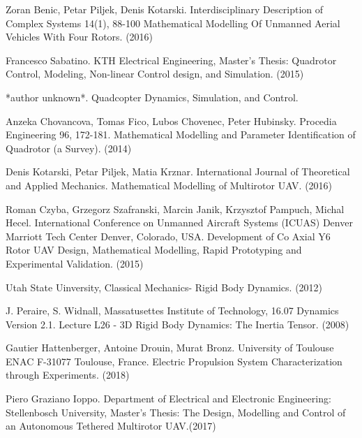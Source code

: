 \documentclass[12pt,a4paper,twoside]{report}
\begin{document}
	\begin{thebibliography}{20}

		
		Zoran Benic, Petar Piljek, Denis Kotarski. Interdisciplinary Description of Complex Systems 14(1), 88-100 Mathematical Modelling Of Unmanned Aerial Vehicles With Four Rotors. (2016)
		
		Francesco Sabatino. KTH Electrical Engineering, Master's Thesis: Quadrotor Control, Modeling, Non-linear Control design, and Simulation. (2015)
		
		*author unknown*. Quadcopter Dynamics, Simulation, and Control.
		
		Anzeka Chovancova, Tomas Fico, Lubos Chovenec, Peter Hubinsky. Procedia Engineering 96, 172-181. Mathematical Modelling and Parameter Identification of Quadrotor (a Survey). (2014)
	
		Denis Kotarski, Petar Piljek, Matia Krznar. International Journal of Theoretical and Applied Mechanics. Mathematical Modelling of Multirotor UAV. (2016)
		
		Roman Czyba, Grzegorz Szafranski, Marcin Janik, Krzysztof Pampuch, Michal Hecel. International Conference on Unmanned Aircraft Systems (ICUAS) Denver Marriott Tech Center Denver, Colorado, USA. Development of Co Axial Y6 Rotor UAV  Design, Mathematical Modelling, Rapid Prototyping and Experimental Validation. (2015)
		
		Utah State Uinversity, Classical Mechanics- Rigid Body Dynamics. (2012)
		
		J. Peraire, S. Widnall, Massatusettes Institute of Technology, 16.07 Dynamics Version 2.1. Lecture L26 - 3D Rigid Body Dynamics: The Inertia Tensor. (2008)
		
		Gautier Hattenberger, Antoine Drouin, Murat Bronz. University of Toulouse ENAC F-31077 Toulouse, France. Electric Propulsion System Characterization through Experiments. (2018)
		
		Piero Graziano Ioppo. Department of Electrical and Electronic Engineering: Stellenbosch University, Master's Thesis: The Design, Modelling and Control of an Autonomous Tethered Multirotor UAV.(2017)
		

\end{thebibliography}
\end{document}
